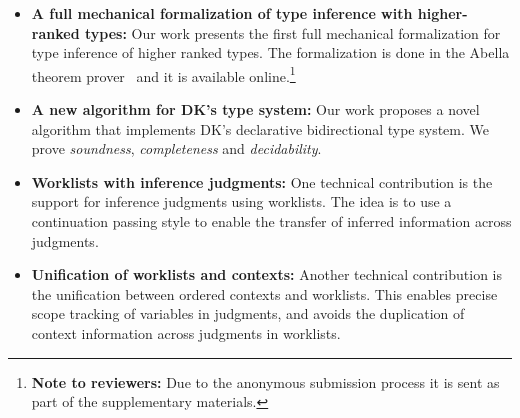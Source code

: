 \begin{itemize}

\item {\bf A full mechanical formalization of type inference with
  higher-ranked types:} Our work presents the first full mechanical formalization
  for type inference of higher ranked types. The formalization is done in the
  Abella theorem prover~\cite{AbellaDesc} and it is available
  online.\footnote{{\bf Note to reviewers:} Due to the anonymous submission process
  it is sent as part of the supplementary materials.}

\item {\bf A new algorithm for DK's type system:} Our work proposes a novel algorithm that implements
  DK's declarative bidirectional type system. We prove
  \emph{soundness}, \emph{completeness} and
  \emph{decidability}. 

\item {\bf Worklists with inference judgments:} One technical contribution is the
  support for inference judgments using worklists. The idea is to
  use a continuation passing style to enable the transfer of inferred information across
  judgments. 

\item {\bf Unification of worklists and contexts:} Another technical contribution is the unification
  between ordered contexts and worklists. This enables precise scope tracking
  of variables in judgments, and avoids the duplication of context information across
  judgments in worklists.

\begin{comment}
\jimmy{Notes @20190211 4 points of novalty:\\
1) Dealing with inference judgments and CPS-style chains\\
2) The form of the judgment itself with a single shared context\\
3) The way we deal with scope (which may follow from 2)\\
4) Immediate substitution (judgment list)
}
\end{comment}

\end{itemize}
